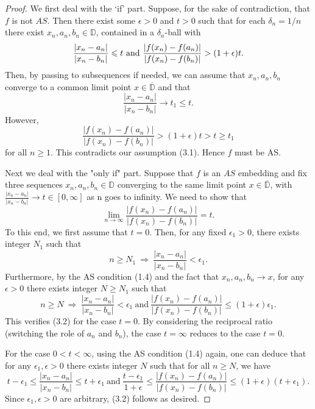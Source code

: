 \documentclass[10pt,a4paper]{amsart}
\def\geq{\geqslant}
\def\leq{\leqslant}
\newcommand{\D}{\mathbb{D}}
\newcommand{\abs}[1]{\lvert#1\rvert}
\renewcommand{\bar}[1]{\overline{#1}}
\begin{document}
\begin{proof}
We first deal with the `if' part.
    Suppose, for the sake of contradiction, that $f$ is not $AS$. Then there exist some $\epsilon>0$ and $t>0$ such that for each $\delta_n=1/n$ there exist $x_n,a_n,b_n\in\D$, contained in a $\delta_n$-ball with
    \[
    \frac{\abs{x_n-a_n}}{\abs{x_n-b_n}}\leq t \ \text{and\  } \\\frac{\abs{f(x_n)-f(a_n)}}{\abs{f(x_n)-f(b_n)}}> (1+\epsilon)t.
    \]
    Then, by passing to subsequences if needed, we can assume that $x_n,a_n,b_n$ converge to a common limit point $x\in\bar\D$ and that 
    \[
    \frac{\abs{x_n-a_n}}{\abs{x_n-b_n}}\to t_{1}\leq t.
    \]
    However,
    \[
    \frac{\abs{f(x_n)-f(a_n)}}{\abs{f(x_n)-f(b_n)}}> (1+\epsilon)t> t\geq t_{1}
    \]
  for all $n\geq 1$. This contradicts our assumption (3.1). Hence $f$ must be AS.

\vspace{0.2cm}
Next we deal with the "only if" part.  
Suppose that $f$ is an $AS$ embedding and fix three sequences $x_n,a_n,b_n\in\D$ converging to the same limit point $x\in\bar\D$, with $\frac{\abs{x_n-a_n}}{\abs{x_n-b_n}}\to t\in [0,\infty]$ as n goes to infinity. We need to show that 
\begin{equation}
\lim_{n\rightarrow\infty}\frac{\abs{f(x_n)-f(a_n)}}{\abs{f(x_n)-f(b_n)}}=t.
\end{equation}
To this end, we first assume that $t=0$. Then, for any fixed $\epsilon_1>0$, there exists integer $N_1$ such that 
$$n\geq N_1 \ \Rightarrow \ \frac{\abs{x_n-a_n}}{\abs{x_n-b_n}}<\epsilon_1. $$
Furthermore, by the AS condition (1.4) and the fact that $x_n,a_n,b_n\rightarrow x$, for any $\epsilon>0$ there exists integer $N\geq N_1$ such that 
$$n\geq N \ \Rightarrow \ \frac{\abs{x_n-a_n}}{\abs{x_n-b_n}}<\epsilon_1 \ 
 \text{and} \ \frac{\abs{f(x_n)-f(a_n)}}{\abs{f(x_n)-f(b_n)}}\leq (1+\epsilon)\epsilon_1. $$
 This verifies (3.2) for the case $t=0$. By considering the reciprocal ratio (switching the role of $a_n$ and $b_n$), the case $t=\infty$ reduces to the case $t=0$. 

 For the case $0<t<\infty$, using the AS condition (1.4) again, one can deduce that for any $\epsilon_1,\epsilon>0$ there exists integer $N$ such that for all $n\geq N$, we have 
\begin{equation}\label{two_sided_AS}
t-\epsilon_1\leq \frac{\abs{x_n-a_n}}{\abs{x_n-b_n}}\leq t+\epsilon_1 \
\text{and} \ \frac{t-\epsilon_1}{1+\epsilon}\leq \frac{\abs{f(x_n)-f(a_n)}}{\abs{f(x_n)-f(b_n)}}\leq (1+\epsilon)(t+\epsilon_1). 
\end{equation}
 Since $\epsilon_1, \epsilon>0$ are arbitrary, (3.2) follows as desired.
\end{proof}
\end{document}
